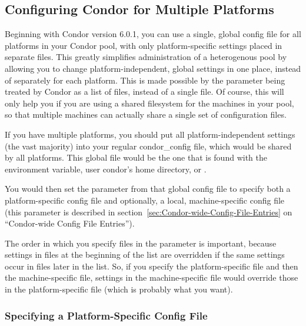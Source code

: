 \subsection{Configuring Condor for Multiple Platforms}
\label{sec:Multiple-Platforms}

Beginning with Condor version 6.0.1, you can use a single, global
config file for all platforms in your Condor pool, with only
platform-specific settings placed in separate files.  This greatly
simplifies administration of a heterogenous pool by allowing you to
change platform-independent, global settings in one place, instead of
separately for each platform.  This is made possible by the
 parameter being treated by Condor as a
list of files, instead of a single file.  Of course, this will only
help you if you are using a shared filesystem for the machines in your
pool, so that multiple machines can actually share a single set of
configuration files.

If you have multiple platforms, you should put all
platform-independent settings (the vast majority) into your regular
condor\_config file, which would be shared by all platforms.  This
global file would be the one that is found with the
 environment variable, user condor's home
directory, or .

You would then set the  parameter from that
global config file to specify both a platform-specific config file and
optionally, a local, machine-specific config file (this parameter is
described in section~\ref{sec:Condor-wide-Config-File-Entries} on
``Condor-wide Config File Entries'').

The order in which you specify files in the
 parameter is important, because settings
in files at the beginning of the list are overridden if the same
settings occur in files later in the list.  So, if you specify the
platform-specific file and then the machine-specific file, settings in
the machine-specific file would override those in the
platform-specific file (which is probably what you want).  

\subsubsection{Specifying a Platform-Specific Config File}
\label{sec:Specify-Platform-Files}

